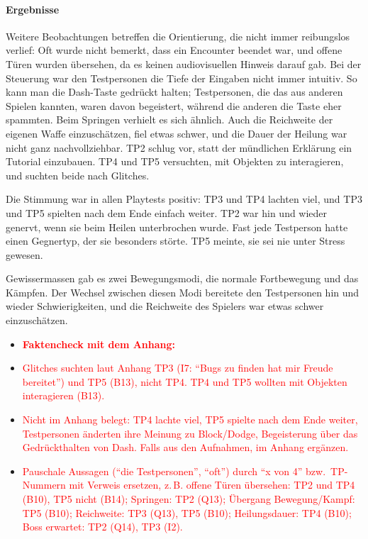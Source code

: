 \documentclass[../Main.tex]{subfiles}
\begin{document}
\paragraph{Ergebnisse}
Weitere Beobachtungen betreffen die Orientierung, die nicht immer reibungslos verlief: Oft wurde nicht bemerkt, dass ein Encounter beendet war, und offene Türen wurden übersehen, da es keinen audiovisuellen Hinweis darauf gab. Bei der Steuerung war den Testpersonen die Tiefe der Eingaben nicht immer intuitiv. So kann man die Dash-Taste gedrückt halten; Testpersonen, die das aus anderen Spielen kannten, waren davon begeistert, während die anderen die Taste eher spammten. Beim Springen verhielt es sich ähnlich. Auch die Reichweite der eigenen Waffe einzuschätzen, fiel etwas schwer, und die Dauer der Heilung war nicht ganz nachvollziehbar. TP2 schlug vor, statt der mündlichen Erklärung ein Tutorial einzubauen. TP4 und TP5 versuchten, mit Objekten zu interagieren, und suchten beide nach Glitches.

Die Stimmung war in allen Playtests positiv: TP3 und TP4 lachten viel, und TP3 und TP5 spielten nach dem Ende einfach weiter. TP2 war hin und wieder genervt, wenn sie beim Heilen unterbrochen wurde. Fast jede Testperson hatte einen Gegnertyp, der sie besonders störte. TP5 meinte, sie sei nie unter Stress gewesen.

Gewissermassen gab es zwei Bewegungsmodi, die normale Fortbewegung und das Kämpfen. Der Wechsel zwischen diesen Modi bereitete den Testpersonen hin und wieder Schwierigkeiten, und die Reichweite des Spielers war etwas schwer einzuschätzen.

\begin{itemize}[leftmargin=1.5cm]
    \item \textcolor{red}{\textbf{Faktencheck mit dem Anhang:}}
    \item \textcolor{red}{Glitches suchten laut Anhang TP3 (I7: \enquote{Bugs zu finden hat mir Freude bereitet}) und TP5 (B13), nicht TP4. TP4 und TP5 wollten mit Objekten interagieren (B13).}
    \item \textcolor{red}{Nicht im Anhang belegt: TP4 lachte viel, TP5 spielte nach dem Ende weiter, Testpersonen änderten ihre Meinung zu Block/Dodge, Begeisterung über das Gedrückthalten von Dash. Falls aus den Aufnahmen, im Anhang ergänzen.}
    \item \textcolor{red}{Pauschale Aussagen (\enquote{die Testpersonen}, \enquote{oft}) durch \enquote{x von 4} bzw.\ TP-Nummern mit Verweis ersetzen, z.\,B. offene Türen übersehen: TP2 und TP4 (B10), TP5 nicht (B14); Springen: TP2 (Q13); Übergang Bewegung/Kampf: TP5 (B10); Reichweite: TP3 (Q13), TP5 (B10); Heilungsdauer: TP4 (B10); Boss erwartet: TP2 (Q14), TP3 (I2).}
\end{itemize}
\end{document}
